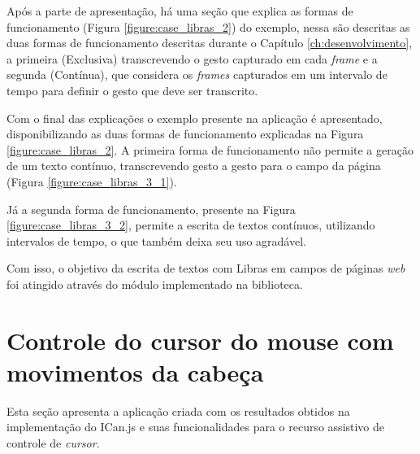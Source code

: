 
\par Após a parte de apresentação, há uma seção que explica as formas de funcionamento (Figura \ref{figure:case_libras_2}) do exemplo, nessa são descritas as duas formas de funcionamento descritas durante o Capítulo \ref{ch:desenvolvimento}, a primeira (Exclusiva) transcrevendo o gesto capturado em cada \textit{frame} e a segunda (Contínua), que considera os \textit{frames} capturados em um intervalo de tempo para definir o gesto que deve ser transcrito.


\par Com o final das explicações o exemplo presente na aplicação é apresentado, disponibilizando as duas formas de funcionamento explicadas na Figura \ref{figure:case_libras_2}. A primeira forma de funcionamento não permite a geração de um texto contínuo, transcrevendo gesto a gesto para o campo da página (Figura \ref{figure:case_libras_3_1}). 


\par Já a segunda forma de funcionamento, presente na Figura \ref{figure:case_libras_3_2}, permite a escrita de textos contínuos, utilizando intervalos de tempo, o que também deixa seu uso agradável.


\par Com isso, o objetivo da escrita de textos com Libras em campos de páginas \textit{web} foi atingido através do módulo implementado na biblioteca.

\section{Controle do cursor do mouse com movimentos da cabeça}

\par Esta seção apresenta a aplicação criada com os resultados obtidos na implementação do ICan.js e suas funcionalidades para o recurso assistivo de controle de \textit{cursor}.

